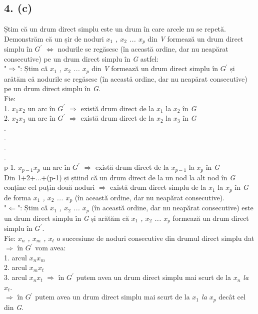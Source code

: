 \documentclass[12pt] {fphw}
\begin{document}
\subsection*{4. (c)}
  Știm că un drum direct simplu este un drum în care arcele nu se repetă. 
  Demonstrăm că un șir de noduri  \textit{  ${}x_{1}$ ,  ${}x_{2}$ ... ${}x_{p}$ } din \textit{V} formează un drum direct simplu în  \textit{ ${}G^{'}$}  $\Leftrightarrow$ nodurile se regăsesc (în această ordine, dar nu neapărat consecutive) pe un drum direct simplu în \textit{G} astfel: \\
"$\Rightarrow$": Știm că \textit{  ${}x_{1}$ ,  ${}x_{2}$ ... ${}x_{p}$ } din \textit{V} formează un drum direct simplu în  \textit{ ${}G^{'}$} și arătăm că nodurile se regăsesc (în această ordine, dar nu neapărat consecutive) pe un drum direct simplu în \textit{G}. \\
Fie: \\
1. \textit{${}x_{1}$}\textit{${}x_{2}$} un arc în  \textit{ ${}G^{'}$}  $\Rightarrow$ există drum direct de la \textit{${}x_{1}$} la \textit{${}x_{2}$} în \textit{G}\\
2. \textit{${}x_{2}$}\textit{${}x_{3}$}  un arc în  \textit{ ${}G^{'}$}  $\Rightarrow$ există drum direct de la \textit{${}x_{2}$} la \textit{${}x_{3}$} în \textit{G}\\
.\\
.\\
.\\
.\\
p-1. \textit{${}x_{p-1}$}\textit{${}x_{p}$}  un arc în  \textit{ ${}G^{'}$}  $\Rightarrow$ există drum direct de la \textit{${}x_{p-1}$} la \textit{${}x_{p}$} în \textit{G}\\
Din 1+2+...+(p-1) și știind că un drum direct de la un nod la alt nod în \textit{G} conține cel puțin două noduri $\Rightarrow$ există drum direct simplu de la \textit{${}x_{1}$} la \textit{${}x_{p}$} în \textit{G}
de forma \textit{  ${}x_{1}$ ,  ${}x_{2}$ ... ${}x_{p}$ } (în această ordine, dar nu neapărat consecutive). \\
"$\Leftarrow$": Știm că \textit{  ${}x_{1}$ ,  ${}x_{2}$ ... ${}x_{p}$ } (în această ordine, dar nu neapărat consecutive) este un drum direct simplu în \textit{G} și arătăm că  \textit{  ${}x_{1}$ ,  ${}x_{2}$ ... ${}x_{p}$ } formează un drum direct simplu în  \textit{ ${}G^{'}$}.  \\
Fie:  \textit{  ${}x_{n}$ ,  ${}x_{m}$ , ${}x_{t}$ } o succesiune de noduri consecutive din drumul direct simplu dat  $\Rightarrow$ în  \textit{ ${}G^{'}$} vom avea: \\
1. arcul \textit{  ${}x_{n}$${}x_{m}$} \\
2. arcul \textit{  ${}x_{m}$${}x_{t}$} \\
3.  arcul \textit{  ${}x_{n}$${}x_{t}$}   $\Rightarrow$ în \textit{ ${}G^{'}$} putem avea un drum direct simplu mai scurt de la  \textit{  ${}x_{n}$ la ${}x_{t}$}. \\
$\Rightarrow$ în \textit{ ${}G^{'}$} putem avea un drum direct simplu mai scurt de  la \textit{  ${}x_{1}$ la ${}x_{p}$} decât cel din \textit{G}. 
\end{document}
